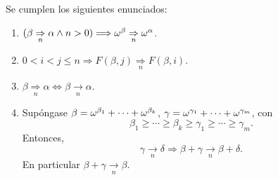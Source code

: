 \begin{lem}\label{kpl5}
    Se cumplen los siguientes enunciados:
    \begin{enumerate}
        \item $(\beta\underset{n}{\Rightarrow}\alpha\land n>0)\Longrightarrow\omega^\beta\underset{n}{\Rightarrow}\omega^\alpha$.
        \item $0<i<j\leq n\Longrightarrow F(\beta,j)\underset{n}{\Rightarrow}F(\beta,i)$.
        \item $\beta\underset{n}{\Rightarrow}\alpha\Longleftrightarrow\beta\underset{n}{\rightarrow}\alpha$.
        \item Supóngase $\beta=\omega^{\beta_1}+\cdots+\omega^{\beta_k}$, $\gamma=\omega^{\gamma_1}+\cdots+\omega^{\gamma_m}$, con
            \[\beta_1\geq\cdots\geq\beta_k\geq\gamma_1\geq\cdots\geq\gamma_m.\]
            Entonces, 
            \[\gamma\underset{n}{\rightarrow}\delta\Longrightarrow\beta+\gamma\underset{n}{\rightarrow}\beta+\delta.\]
            En particular $\beta+\gamma\underset{n}{\rightarrow}\beta$.
    \end{enumerate}
\end{lem}
